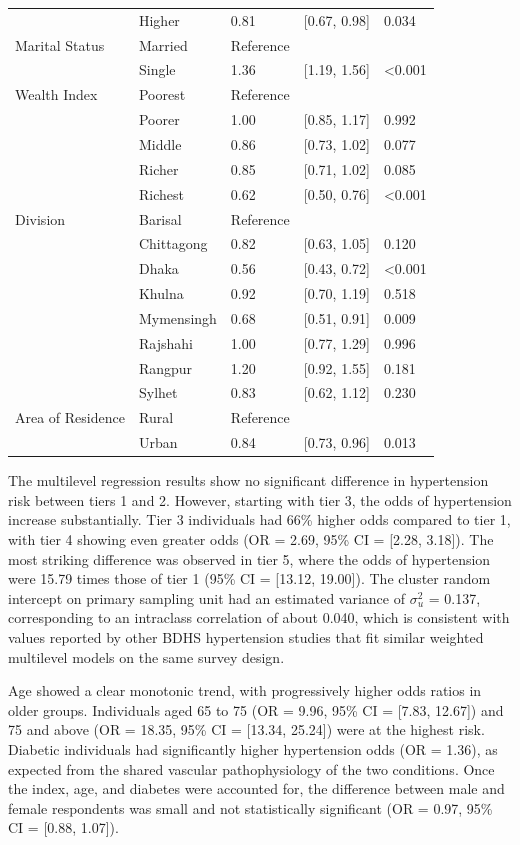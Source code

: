 \documentclass[
  12pt,
  a4paper]{article}
\begin{document}
\begin{longtable}[t]{lllll}
 & Higher & 0.81 & {}[0.67, 0.98] & 0.034\\
Marital Status & Married & Reference &  & \\
 & Single & 1.36 & {}[1.19, 1.56] & <0.001\\
Wealth Index & Poorest & Reference &  & \\
 & Poorer & 1.00 & {}[0.85, 1.17] & 0.992\\
 & Middle & 0.86 & {}[0.73, 1.02] & 0.077\\
 & Richer & 0.85 & {}[0.71, 1.02] & 0.085\\
 & Richest & 0.62 & {}[0.50, 0.76] & <0.001\\
Division & Barisal & Reference &  & \\
 & Chittagong & 0.82 & {}[0.63, 1.05] & 0.120\\
 & Dhaka & 0.56 & {}[0.43, 0.72] & <0.001\\
 & Khulna & 0.92 & {}[0.70, 1.19] & 0.518\\
 & Mymensingh & 0.68 & {}[0.51, 0.91] & 0.009\\
 & Rajshahi & 1.00 & {}[0.77, 1.29] & 0.996\\
 & Rangpur & 1.20 & {}[0.92, 1.55] & 0.181\\
 & Sylhet & 0.83 & {}[0.62, 1.12] & 0.230\\
Area of Residence & Rural & Reference &  & \\
 & Urban & 0.84 & {}[0.73, 0.96] & 0.013\\
\bottomrule
\end{longtable}

The multilevel regression results show no significant difference in hypertension risk between tiers 1 and 2. However, starting with tier 3, the odds of hypertension increase substantially. Tier 3 individuals had 66\% higher odds compared to tier 1, with tier 4 showing even greater odds (OR = 2.69, 95\% CI = {[}2.28, 3.18{]}). The most striking difference was observed in tier 5, where the odds of hypertension were 15.79 times those of tier 1 (95\% CI = {[}13.12, 19.00{]}). The cluster random intercept on primary sampling unit had an estimated variance of \(\sigma^2_u\) = 0.137, corresponding to an intraclass correlation of about 0.040, which is consistent with values reported by other BDHS hypertension studies that fit similar weighted multilevel models on the same survey design.

Age showed a clear monotonic trend, with progressively higher odds ratios in older groups. Individuals aged 65 to 75 (OR = 9.96, 95\% CI = {[}7.83, 12.67{]}) and 75 and above (OR = 18.35, 95\% CI = {[}13.34, 25.24{]}) were at the highest risk. Diabetic individuals had significantly higher hypertension odds (OR = 1.36), as expected from the shared vascular pathophysiology of the two conditions. Once the index, age, and diabetes were accounted for, the difference between male and female respondents was small and not statistically significant (OR = 0.97, 95\% CI = {[}0.88, 1.07{]}).
\end{document}
